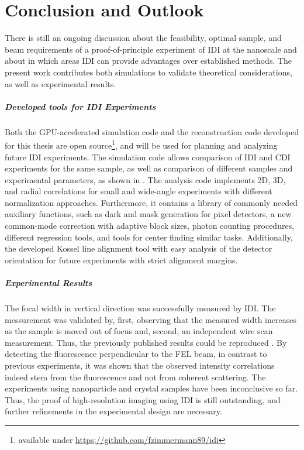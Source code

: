		\chapter{Conclusion and Outlook}
	There is still an ongoing discussion about the feasibility, optimal sample, and beam requirements of a proof-of-principle experiment of IDI at the nanoscale and about in which areas IDI can provide advantages over established methods. The present work contributes both simulations to validate theoretical considerations, as well as experimental results.
	
	\paragraph{Developed tools for IDI Experiments}
Both the GPU-accelerated simulation code and the reconstruction code developed for this thesis are open source\footnote{available under \url{https;//github.com/fzimmermann89/idi}}, and will be used for planning and analyzing future IDI experiments. The simulation code allows comparison of IDI and CDI experiments for the same sample, as well as comparison of different samples and experimental parameters, as shown in .
The analysis code implements 2D, 3D, and radial correlations for small and wide-angle experiments with different normalization approaches. Furthermore, it contains a library of commonly needed auxiliary functions, such as dark and mask generation for pixel detectors, a new common-mode correction with adaptive block sizes, photon counting procedures, different regression tools, and tools for center finding similar tasks.
Additionally, the developed Kossel line alignment tool with easy analysis of the detector orientation for future experiments with strict alignment margins.

\paragraph{Experimental Results}
The focal width in vertical direction was successfully measured by IDI. The messurement was validated by, first, observing that the measured width increases as the sample is moved out of focus and, second, an independent wire scan measurement. Thus, the previously published results could be reproduced \cite{nakumura2020}. By detecting the fluorescence perpendicular to the FEL beam, in contrast to previous experiments, it was shown that the observed intensity correlations indeed stem from the fluorescence and not from coherent scattering. 
The experiments using nanoparticle and crystal samples have been inconclusive so far. Thus, the proof of high-resolution imaging using IDI is still outstanding, and further refinements in the experimental design are necessary.


